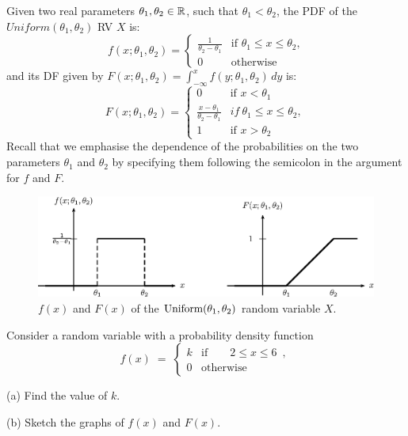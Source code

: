 \begin{model}\label{M:Uniformab}
Given two real parameters $\theta_1,\theta_2 \in \mathbb{R}$, such that $\theta_1 < \theta_2$, the PDF of the $Uniform(\theta_1,\theta_2)$ RV $X$ is:
\begin{equation}\label{E:Uniformabpdf}
f(x;\theta_1,\theta_2) =
\begin{cases}
\frac{1}{\theta_2 - \theta_1} & \text{if $\theta_1 \leq x \leq \theta_2$,}\\
0 & \text{otherwise}
\end{cases}
\end{equation}
and its DF given by $F(x;\theta_1,\theta_2) = \int_{- \infty}^x f(y; \theta_1,\theta_2) \, dy$ is:
\begin{equation}\label{E:Uniformabcdf}
F(x; \theta_1,\theta_2) =
\begin{cases}
0 & \text{if $x < \theta_1$} \\
\frac{x-\theta_1}{\theta_2-\theta_1} & if~\theta_1 \leq x \leq \theta_2,\\
1 & \text{if $x > \theta_2$}
\end{cases}
\end{equation}
Recall that we emphasise the dependence of the probabilities on the two parameters $\theta_1$ and $\theta_2$ by specifying them following the semicolon in the argument for $f$ and $F$.
\end{model}

\begin{figure}[htbp]
\begin{center}
\includegraphics{pstricks/uniftheta1theta2fF}
\caption{$f(x)$ and $F(x)$ of the $\mbox{{\rm Uniform}}(\theta_1,\theta_2)$ random variable $X$.}
\end{center}
\end{figure}


\begin{Exercise}\label{xPDFHeightOfUniformOn2_6}
{Consider  a random variable with a probability density function
\[f(x)\;=\;\begin{cases}\displaystyle k & \textrm{if} \qquad  2\leq
  x\leq 6 \enspace,\\0& \text{otherwise}
\end{cases}
\]
\be
\item[(a)] Find the value of $k$.
\item[(b)] Sketch the graphs of $f(x)$ and $F(x)$.
\ee
}
\end{Exercise}

